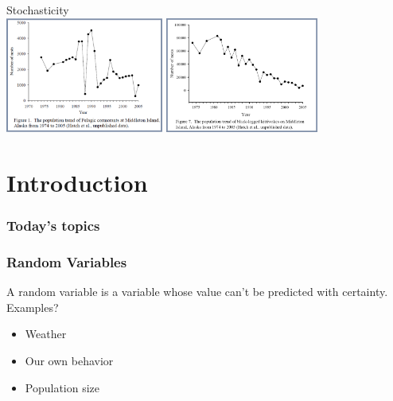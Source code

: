 \documentclass[color=usenames,dvipsnames]{beamer}\usepackage[]{graphicx}\usepackage[]{color}
\begin{document}
\begin{frame}[plain]
  \begin{center}
    {\huge Stochasticity} \\
    \vfill
    \includegraphics[height=3.8cm,keepaspectratio]{figs/pelagic-cormorants} \hspace{0.1cm}
    \includegraphics[height=3.8cm,keepaspectratio]{figs/kittiwakes} %
  \end{center}
\end{frame}




\section{Introduction}


\begin{frame}[plain]
  \frametitle{Today's topics}
  \tableofcontents%
\end{frame}




\begin{frame}
  \frametitle{Random Variables}
  \large
  A random variable is a variable whose value can't be predicted
  with certainty. \\
  \pause
  \vfill
  Examples?
  \begin{itemize}
    \item Weather
    \item Our own behavior
    \item Population size
  \end{itemize}
\end{frame}
\end{document}
